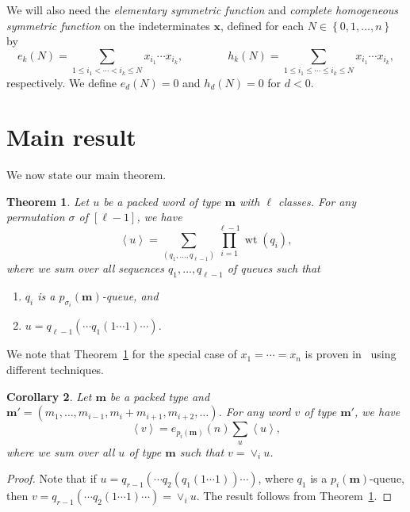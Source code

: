 \documentclass[submission]{FPSAC2018}
\newcommand{\0}{\phantom{c}}
\newcommand{\swt}[1]{\left\langle #1 \right\rangle} %
\newcommand{\merge}[2]{\vee_{#1}#2} %
\DeclareMathOperator{\wt}{wt} %
\newcommand{\xx}{\mathbf{x}}
\newcommand{\mm}{\mathbf{m}}
\let\sumnonlimits\sum
\let\prodnonlimits\prod
\renewcommand{\sum}{\sumnonlimits\limits}
\renewcommand{\prod}{\prodnonlimits\limits}
\newcommand{\defn}[1]{{\color{darkred}\emph{#1}}} %
\theoremstyle{plain}
\newtheorem{thm}{Theorem}[section]
\newtheorem{cor}[thm]{Corollary}
\theoremstyle{definition}
\numberwithin{equation}{section}
\begin{document}
We will also need the \defn{elementary symmetric function} and \defn{complete homogeneous symmetric function} on the indeterminates $\xx$,
defined for each $N \in \left\{0,1,\ldots,n\right\}$ by
\[
e_k(N) = \sum_{1 \leq i_1 < \cdots < i_k \leq N} x_{i_1} \dotsm x_{i_k},
\qquad\qquad
h_k(N) = \sum_{1 \leq i_1 \leq \cdots \leq i_k \leq N} x_{i_1} \dotsm x_{i_k},
\]
respectively.
We define $e_d(N) = 0$ and $h_d(N) = 0$ for $d < 0$.








\section{Main result}
\label{sec:result}

We now state our main theorem.

\begin{thm}
\label{thm:permutation}
  Let $u$ be a packed word of type $\mm$ with $\ell$ classes.
  For any permutation $\sigma$ of $[\ell-1]$, we have 
  \[
  \swt{u} = \sum_{(q_1, \dots, q_{\ell-1})} \prod_{i=1}^{\ell-1} \wt(q_i),
  \]
  where we sum over all sequences $q_1, \dotsc, q_{\ell-1}$ of queues such that
  \begin{enumerate}
  \item $q_i$ is a $p_{\sigma_i}(\mm)$-queue, and
  \item $u = q_{\ell-1}(\cdots q_1(1\dotsm 1) \cdots )$.
  \end{enumerate}
\end{thm}

We note that Theorem~\ref{thm:permutation} for the special case of $x_1 = \cdots = x_n$ is proven in~\cite{AAMP} using different techniques.

\begin{cor}
  Let $\mm$ be a packed type and $\mm' = (m_1, \dotsc, m_{i-1}, m_i + m_{i+1}, m_{i+2}, \ldots)$.
  For any word $v$ of type $\mm'$, we have
\[
  \swt{v} = e_{p_i(\mm)}(n) \sum_u \swt{u},
\]
where we sum over all $u$ of type $\mm$ such that $v = \merge{i}{u}$.
\end{cor}

\begin{proof}
  Note that if $u = q_{r-1}( \cdots q_2(q_1(1 \dotsm 1)) \cdots)$, where $q_1$ is a $p_i(\mm)$-queue, then $v = q_{r-1}( \cdots q_2(1 \dotsm 1) \cdots) = \merge{i}{u}$.
  The result follows from Theorem~\ref{thm:permutation}.
\end{proof}
\end{document}
